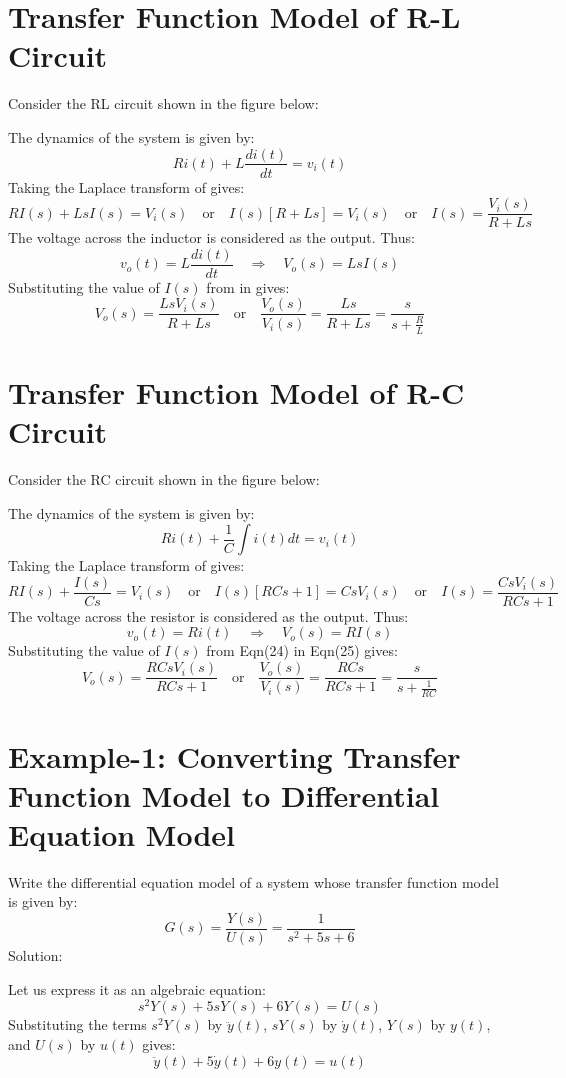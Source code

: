 \documentclass[../notes-main.tex]{subfiles}
\begin{document}
\section{Transfer Function Model of R-L Circuit}

Consider the RL circuit shown in the figure below:

The dynamics of the system is given by:
\[
Ri(t) + L\frac{di(t)}{dt} = v_i(t)
\]
Taking the Laplace transform of  gives:
\[
RI(s) + LsI(s) = V_i(s) \quad \text{or} \quad I(s)[R+Ls] = V_i(s) \quad \text{or} \quad I(s) = \frac{V_i(s)}{R+Ls}
\]
The voltage across the inductor is considered as the output. Thus:
\[
v_o(t) = L\frac{di(t)}{dt} \quad \Rightarrow \quad V_o(s) = LsI(s)
\]
Substituting the value of \( I(s) \) from  in  gives:
\[
V_o(s) = \frac{LsV_i(s)}{R+Ls} \quad \text{or} \quad \frac{V_o(s)}{V_i(s)} = \frac{Ls}{R+Ls} = \frac{s}{s+\frac{R}{L}}
\]

\section{Transfer Function Model of R-C Circuit}

Consider the RC circuit shown in the figure below:

The dynamics of the system is given by:
\[
Ri(t) + \frac{1}{C}\int i(t)dt = v_i(t)
\]
Taking the Laplace transform of  gives:
\[
RI(s) + \frac{I(s)}{Cs} = V_i(s) \quad \text{or} \quad I(s)[RCs + 1] = CsV_i(s) \quad \text{or} \quad I(s) = \frac{CsV_i(s)}{RCs + 1}
\]
The voltage across the resistor is considered as the output. Thus:
\[
v_o(t) = Ri(t) \quad \Rightarrow \quad V_o(s) = RI(s)
\]
Substituting the value of \( I(s) \) from Eqn(24) in Eqn(25) gives:
\[
V_o(s) = \frac{RCsV_i(s)}{RCs + 1} \quad \text{or} \quad \frac{V_o(s)}{V_i(s)} = \frac{RCs}{RCs + 1} = \frac{s}{s+\frac{1}{RC}}
\]
\section{Example-1: Converting Transfer Function Model to Differential Equation Model}

Write the differential equation model of a system whose transfer function model is given by:
\[
G(s) = \frac{Y(s)}{U(s)} = \frac{1}{s^2 + 5s + 6}
\]
Solution:

Let us express it as an algebraic equation:
\[
s^2Y(s) + 5sY(s) + 6Y(s) = U(s)
\]
Substituting the terms \( s^2Y(s) \) by \( \ddot{y}(t) \), \( sY(s) \) by \( \dot{y}(t) \), \( Y(s) \) by \( y(t) \), and \( U(s) \) by \( u(t) \) gives:
\[
\ddot{y}(t) + 5\dot{y}(t) + 6y(t) = u(t)
\]
\end{document}
